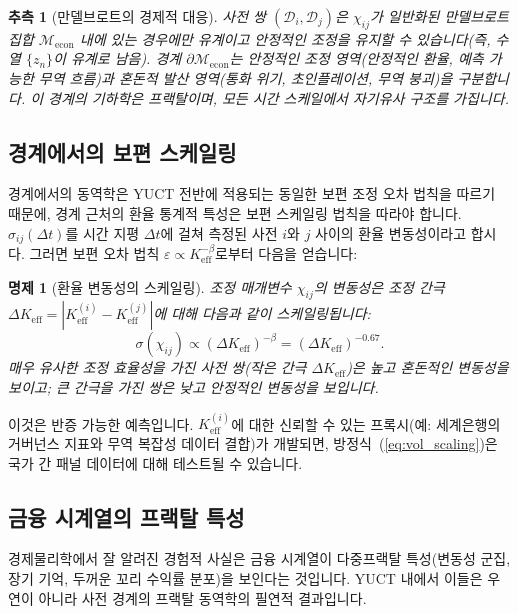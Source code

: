 \documentclass[12pt,a4paper]{article}
\newtheorem{proposition}[theorem]{명제}
\newtheorem{conjecture}[theorem]{추측}
\theoremstyle{remark}
\begin{document}
	\begin{conjecture}[만델브로트의 경제적 대응]
		사전 쌍 \((\mathcal{D}_i, \mathcal{D}_j)\)은 \(\chi_{ij}\)가 일반화된 만델브로트 집합 \(\mathcal{M}_{\mathrm{econ}}\) 내에 있는 경우에만 유계이고 안정적인 조정을 유지할 수 있습니다(즉, 수열 \(\{z_n\}\)이 유계로 남음). 경계 \(\partial\mathcal{M}_{\mathrm{econ}}\)는 안정적인 조정 영역(안정적인 환율, 예측 가능한 무역 흐름)과 혼돈적 발산 영역(통화 위기, 초인플레이션, 무역 붕괴)을 구분합니다. 이 경계의 기하학은 프랙탈이며, 모든 시간 스케일에서 자기유사 구조를 가집니다.
	\end{conjecture}
	
	\subsection{경계에서의 보편 스케일링}
	
	경계에서의 동역학은 YUCT 전반에 적용되는 동일한 보편 조정 오차 법칙을 따르기 때문에, 경계 근처의 환율 통계적 특성은 보편 스케일링 법칙을 따라야 합니다. \(\sigma_{ij}(\Delta t)\)를 시간 지평 \(\Delta t\)에 걸쳐 측정된 사전 \(i\)와 \(j\) 사이의 환율 변동성이라고 합시다. 그러면 보편 오차 법칙 \(\varepsilon \propto K_{\mathrm{eff}}^{-\beta}\)로부터 다음을 얻습니다:
	
	\begin{proposition}[환율 변동성의 스케일링]
		조정 매개변수 \(\chi_{ij}\)의 변동성은 조정 간극 \(\Delta K_{\mathrm{eff}} = |K_{\mathrm{eff}}^{(i)} - K_{\mathrm{eff}}^{(j)}|\)에 대해 다음과 같이 스케일링됩니다:
		\begin{equation}
			\sigma(\chi_{ij}) \propto (\Delta K_{\mathrm{eff}})^{-\beta} = (\Delta K_{\mathrm{eff}})^{-0.67}.
			\label{eq:vol_scaling}
		\end{equation}
		매우 유사한 조정 효율성을 가진 사전 쌍(작은 간극 \(\Delta K_{\mathrm{eff}}\))은 높고 혼돈적인 변동성을 보이고; 큰 간극을 가진 쌍은 낮고 안정적인 변동성을 보입니다.
	\end{proposition}
	
	이것은 반증 가능한 예측입니다. \(K_{\mathrm{eff}}^{(i)}\)에 대한 신뢰할 수 있는 프록시(예: 세계은행의 거버넌스 지표와 무역 복잡성 데이터 결합)가 개발되면, 방정식~(\ref{eq:vol_scaling})은 국가 간 패널 데이터에 대해 테스트될 수 있습니다.
	
	\subsection{금융 시계열의 프랙탈 특성}
	경제물리학에서 잘 알려진 경험적 사실은 금융 시계열이 다중프랙탈 특성(변동성 군집, 장기 기억, 두꺼운 꼬리 수익률 분포)을 보인다는 것입니다. YUCT 내에서 이들은 우연이 아니라 사전 경계의 프랙탈 동역학의 필연적 결과입니다.
	
\end{document}
